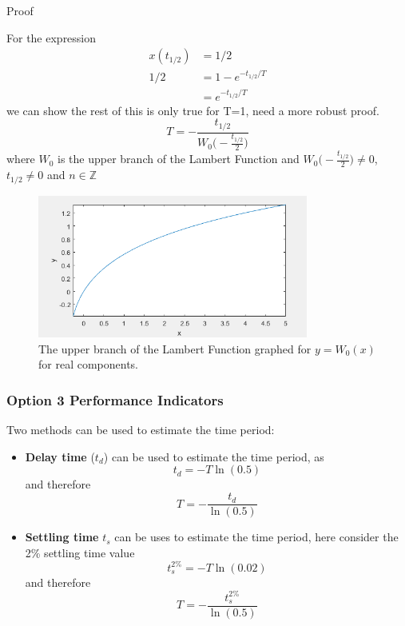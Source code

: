 \documentclass[12pt,letter]{article}
\numberwithin{ex}{section} %
\numberwithin{re}{section} %
\newcommand{\gr}[1]{\textcolor[rgb]{0.00,0.50,0.00}{#1}}
\newcommand{\rd}[1]{\textcolor[rgb]{0.75,0.00,0.00}{#1}}
\numberwithin{equation}{section}	%
\begin{document}
\begin{itemize}
\begin{itemize}
\begin{mdframed}[middlelinewidth=0.5mm]
	\begin{center}
		\gr{Proof}
	\end{center}
For the expression
\begin{align}
x(t_{1/2}) &= 1/2 \\
1/2 &= 1-e^{-t_{1/2}/T} \nonumber \\
&= e^{-t_{1/2}/T} \nonumber
\end{align}
we can show \rd{the rest of this is only true for T=1, need a more robust proof.}
\begin{equation}
T=-\frac{t_{1/2}}{W_0 \big(-\frac{t_{1/2}}{2}\big)}
\end{equation}
where $W_0$ is the upper branch of the Lambert Function and $W_0\big(-\frac{t_{1/2}}{2}\big) \neq 0$, $t_{1/2} \neq 0 $ and $n \in \mathbb{Z} $
\begin{figure}[H]
    \centering
    \includegraphics[width=3.5in]{../figures/Lambert_function}
	\caption{The upper branch of the Lambert Function graphed for $y = W_0(x)$ for real components. }
\end{figure}

\end{mdframed}




\end{itemize}
\end{itemize}

\subsubsection{Option 3 Performance Indicators}
 
Two methods can be used to estimate the time period:
\begin{itemize}
\item \textbf{Delay time} ($t_d$) can be used to estimate the time period, as 
\begin{equation}
t_d = -T \ln(0.5)
\end{equation}
and therefore
\begin{equation}
T = - \frac{t_d}{\ln(0.5)}
\end{equation}
\item \textbf{Settling time} $t_s$ can be uses to estimate the time period, here consider the 2\% settling time value 
\begin{equation}
t_s^{2\%} = -T \ln(0.02)
\end{equation}
and therefore
\begin{equation}
T = - \frac{t_s^{2\%}}{\ln(0.5)}
\end{equation}
\end{itemize}
\end{document}
